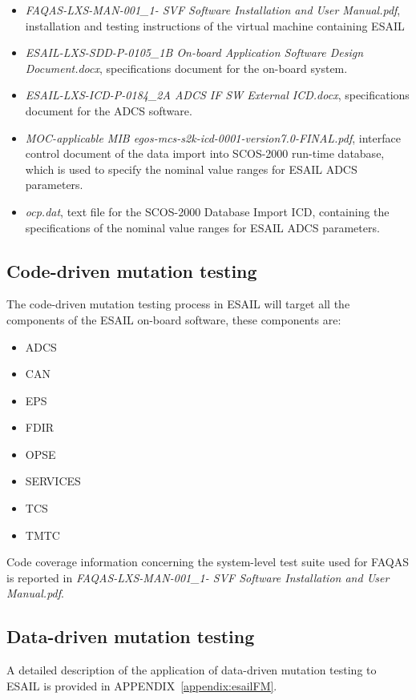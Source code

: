 \begin{itemize}
	\item \emph{FAQAS-LXS-MAN-001\_1- SVF Software Installation and User Manual.pdf}, installation and testing instructions of the virtual machine containing ESAIL
	\item \emph{ESAIL-LXS-SDD-P-0105\_1B On-board Application Software Design Document.docx}, specifications document for the on-board system.
	\item \emph{ESAIL-LXS-ICD-P-0184\_2A ADCS IF SW External ICD.docx}, specifications document for the ADCS software.
	\item \emph{MOC-applicable MIB egos-mcs-s2k-icd-0001-version7.0-FINAL.pdf},  interface control document of the data import into SCOS-2000 run-time database, which is used to specify  the nominal value ranges for ESAIL ADCS parameters.
	\item \emph{ocp.dat}, text file for the SCOS-2000 Database Import ICD, containing the specifications of the nominal value ranges for ESAIL ADCS parameters.
\end{itemize}	


\subsection{Code-driven mutation testing}


The code-driven mutation testing process in ESAIL will target all the components of the ESAIL on-board software, these components are:

\begin{itemize}
	\item ADCS
	\item CAN
	\item EPS
	\item FDIR
	\item OPSE
	\item SERVICES
	\item TCS
	\item TMTC
\end{itemize}

Code coverage information concerning the system-level test suite used for FAQAS is reported in \emph{FAQAS-LXS-MAN-001\_1- SVF Software Installation and User Manual.pdf}.

\subsection{Data-driven mutation testing}

A detailed description of the application of data-driven mutation testing to ESAIL is provided in APPENDIX~\ref{appendix:esailFM}.

